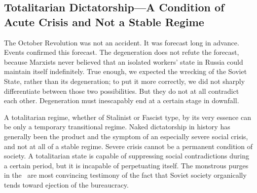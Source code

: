 \subsection*{Totalitarian Dictatorship---A Condition of Acute Crisis and Not a Stable Regime}

The October Revolution was not an accident. It was forecast long in advance. Events confirmed this forecast. The degeneration does not refute the forecast, because Marxists never believed that an isolated workers’ state in Russia could maintain itself indefinitely. True enough, we expected the wrecking of the Soviet State, rather than its degeneration; to put it more correctly, we did not sharply differentiate between those two possibilities. But they do not at all contradict each other. Degeneration must inescapably end at a certain stage in downfall.
\nowidow

A totalitarian regime, whether of Stalinist or Fascist type, by its very essence can be only a temporary transitional regime. Naked dictatorship in history has generally been the product and the symptom of an especially severe social crisis, and not at all of a stable regime. Severe crisis cannot be a permanent condition of society. A totalitarian state is capable of suppressing social contradictions during a certain period, but it is incapable of perpetuating itself. The monstrous purges in the \USSR\ are most convincing testimony of the fact that Soviet society organically tends toward ejection of the bureaucracy.

